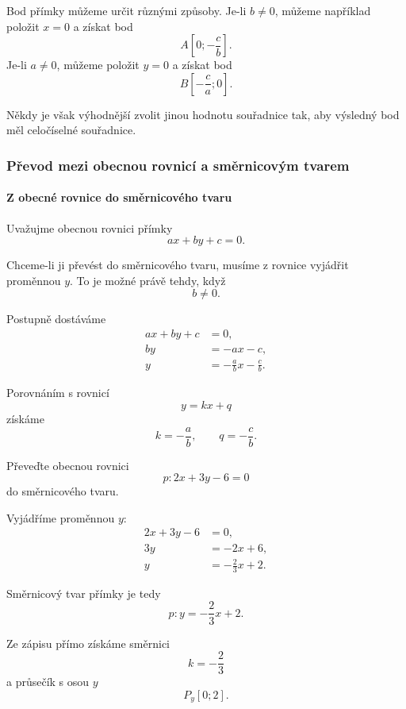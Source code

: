 \begin{remark}\label{rem:Choosing_point_general_to_parametric}
    Bod přímky můžeme určit různými způsoby. Je-li $b\neq0$, můžeme
    například položit $x=0$ a získat bod
    \[
        A\left[0;-\frac{c}{b}\right].
    \]
    Je-li $a\neq0$, můžeme položit $y=0$ a získat bod
    \[
        B\left[-\frac{c}{a};0\right].
    \]

    Někdy je však výhodnější zvolit jinou hodnotu souřadnice tak, aby
    výsledný bod měl celočíselné souřadnice.
\end{remark}


\subsubsection{Převod mezi obecnou rovnicí a směrnicovým tvarem}
\label{subsubsec:Conversion_general_slope}

\paragraph{Z obecné rovnice do směrnicového tvaru}

Uvažujme obecnou rovnici přímky
\[
    ax+by+c=0.
\]

Chceme-li ji převést do směrnicového tvaru, musíme z rovnice vyjádřit
proměnnou $y$. To je možné právě tehdy, když
\[
    b\neq0.
\]

Postupně dostáváme
\begin{align*}
    ax+by+c&=0,\\
    by&=-ax-c,\\
    y&=-\frac{a}{b}x-\frac{c}{b}.
\end{align*}

Porovnáním s rovnicí
\[
    y=kx+q
\]
získáme
\begin{equation}\label{eq:Conversion_general_to_slope}
    k=-\frac{a}{b},
    \qquad
    q=-\frac{c}{b}.
\end{equation}

\begin{example}\label{exa:Conversion_general_to_slope}
    Převeďte obecnou rovnici
    \[
        p:2x+3y-6=0
    \]
    do směrnicového tvaru.

    Vyjádříme proměnnou $y$:
    \begin{align*}
        2x+3y-6&=0,\\
        3y&=-2x+6,\\
        y&=-\frac{2}{3}x+2.
    \end{align*}

    Směrnicový tvar přímky je tedy
    \[
        p:y=-\frac{2}{3}x+2.
    \]

    Ze zápisu přímo získáme směrnici
    \[
        k=-\frac{2}{3}
    \]
    a průsečík s osou $y$
    \[
        P_y[0;2].
    \]
\end{example}


